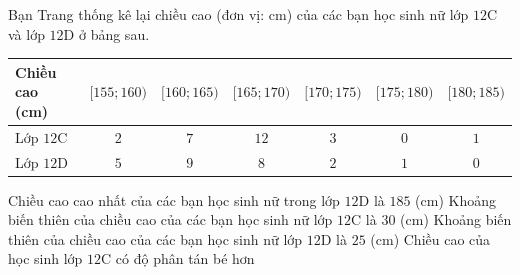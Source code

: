 \begin{ex}%
	Bạn Trang thống kê lại chiều cao (đơn vị: cm) của các bạn học sinh nữ lớp $12\mathrm{C}$ và lớp $12\mathrm{D}$ ở bảng sau.
	\begin{center}
		\begin{tabular}{|l|c|c|c|c|c|c|}
			\hline
			Chiều cao (cm) & $[155;160)$ & $[160;165)$ & $[165;170)$ & $[170;175)$ & $[175;180)$ & $[180;185)$\\ \hline
			Lớp $12\mathrm{C}$ & $2$ & $7$ & $12$ & $3$ & $0$ & $1$\\ \hline
			Lớp $12\mathrm{D}$ & $5$ & $9$ & $8$ & $2$ & $1$ & $0$\\
			\hline
		\end{tabular}
	\end{center}
	\choiceTF
	{Chiều cao cao nhất của các bạn học sinh nữ trong lớp $12\mathrm{D}$ là $185$ (cm)}
	{\True Khoảng biến thiên của chiều cao của các bạn học sinh nữ lớp $12\mathrm{C}$ là $30$ (cm)}
	{\True Khoảng biến thiên của chiều cao của các bạn học sinh nữ lớp $12\mathrm{D}$ là $25$ (cm)}
	{Chiều cao của học sinh lớp $12\mathrm{C}$ có độ phân tán bé hơn}
\end{ex}

